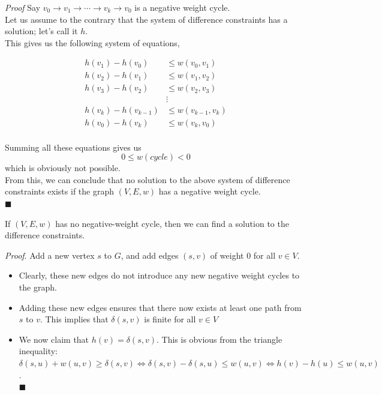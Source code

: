 \documentclass{beamer}
\renewcommand{\qed}{\\ \hfill $\blacksquare$}
\begin{document}
\begin{frame}{\textit{Proof}}
    \scriptsize
    Say $v_0 \rightarrow v_1 \rightarrow \cdots \rightarrow v_k \rightarrow v_0$ is a negative weight cycle.\\
    Let us assume to the contrary that the system of difference constraints has a solution; let's call it $h$.\\
    This gives us the following system of equations,

    \begin{equation*}
        \begin{align*}
            h(v_1) - h(v_0) & \leq w(v_0, v_1) \\
            h(v_2) - h(v_1) & \leq w(v_1, v_2) \\
            h(v_3) - h(v_2) & \leq w(v_2, v_3) \\
                            & \vdots \\
            h(v_k) - h(v_{k-1}) & \leq w(v_{k-1}, v_k) \\
            h(v_0) - h(v_k) & \leq w(v_k, v_0) \\
        \end{align*}
    \end{equation*}

    Summing all these equations gives us
    $$
        0 \leq w(cycle) < 0
    $$
    which is obviously not possible. \\
    From this, we can conclude that no solution to the above system of difference constraints exists if the graph $(V, E, w)$ has a negative weight cycle. \qed
\end{frame}

\begin{frame}{}
    \begin{tcolorbox}[title=Theorem.]
        If $(V, E, w)$ has no negative-weight cycle, then we can ﬁnd a solution to the difference constraints.
    \end{tcolorbox}
    \scriptsize
    \textit{Proof}. Add a new vertex $s$ to $G$, and add edges $(s, v)$ of weight $0$ for all $v \in V$.
    \begin{itemize}
        \item Clearly, these new edges do not introduce any new negative weight cycles to the graph.
        \item Adding these new edges ensures that there now exists at least one path from $s$ to $v$. This implies that $\delta(s, v)$ is finite for all $v \in V$
        \item We now claim that $h(v) = \delta(s, v)$. This is obvious from the triangle inequality: $\delta(s, u) + w(u, v) \geq \delta(s, v) \Leftrightarrow \delta(s, v) - \delta(s, u) \leq w(u, v) \Leftrightarrow h(v) - h(u) \leq w(u, v)$. \qed
    \end{itemize}
\end{frame}
\end{document}
